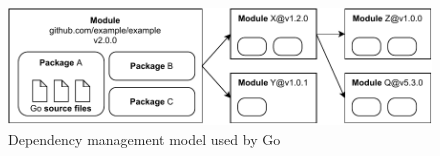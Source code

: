 \begin{figure}[htp!]
    \centering
    \includegraphics[width=\textwidth]{assets/figures/chapter2/dependency-model.pdf}
    \caption{Dependency management model used by Go}
    \label{fig:dependency-model}
\end{figure}
